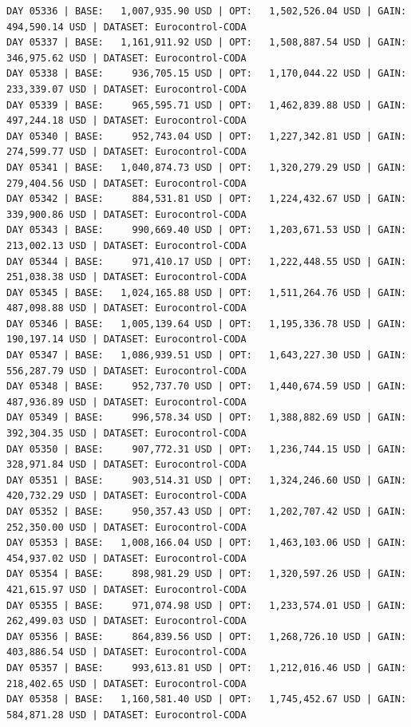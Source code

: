 \documentclass[11pt,a4paper]{article}
\begin{document}
\begin{verbatim}
DAY 05336 | BASE:   1,007,935.90 USD | OPT:   1,502,526.04 USD | GAIN: 494,590.14 USD | DATASET: Eurocontrol-CODA
DAY 05337 | BASE:   1,161,911.92 USD | OPT:   1,508,887.54 USD | GAIN: 346,975.62 USD | DATASET: Eurocontrol-CODA
DAY 05338 | BASE:     936,705.15 USD | OPT:   1,170,044.22 USD | GAIN: 233,339.07 USD | DATASET: Eurocontrol-CODA
DAY 05339 | BASE:     965,595.71 USD | OPT:   1,462,839.88 USD | GAIN: 497,244.18 USD | DATASET: Eurocontrol-CODA
DAY 05340 | BASE:     952,743.04 USD | OPT:   1,227,342.81 USD | GAIN: 274,599.77 USD | DATASET: Eurocontrol-CODA
DAY 05341 | BASE:   1,040,874.73 USD | OPT:   1,320,279.29 USD | GAIN: 279,404.56 USD | DATASET: Eurocontrol-CODA
DAY 05342 | BASE:     884,531.81 USD | OPT:   1,224,432.67 USD | GAIN: 339,900.86 USD | DATASET: Eurocontrol-CODA
DAY 05343 | BASE:     990,669.40 USD | OPT:   1,203,671.53 USD | GAIN: 213,002.13 USD | DATASET: Eurocontrol-CODA
DAY 05344 | BASE:     971,410.17 USD | OPT:   1,222,448.55 USD | GAIN: 251,038.38 USD | DATASET: Eurocontrol-CODA
DAY 05345 | BASE:   1,024,165.88 USD | OPT:   1,511,264.76 USD | GAIN: 487,098.88 USD | DATASET: Eurocontrol-CODA
DAY 05346 | BASE:   1,005,139.64 USD | OPT:   1,195,336.78 USD | GAIN: 190,197.14 USD | DATASET: Eurocontrol-CODA
DAY 05347 | BASE:   1,086,939.51 USD | OPT:   1,643,227.30 USD | GAIN: 556,287.79 USD | DATASET: Eurocontrol-CODA
DAY 05348 | BASE:     952,737.70 USD | OPT:   1,440,674.59 USD | GAIN: 487,936.89 USD | DATASET: Eurocontrol-CODA
DAY 05349 | BASE:     996,578.34 USD | OPT:   1,388,882.69 USD | GAIN: 392,304.35 USD | DATASET: Eurocontrol-CODA
DAY 05350 | BASE:     907,772.31 USD | OPT:   1,236,744.15 USD | GAIN: 328,971.84 USD | DATASET: Eurocontrol-CODA
DAY 05351 | BASE:     903,514.31 USD | OPT:   1,324,246.60 USD | GAIN: 420,732.29 USD | DATASET: Eurocontrol-CODA
DAY 05352 | BASE:     950,357.43 USD | OPT:   1,202,707.42 USD | GAIN: 252,350.00 USD | DATASET: Eurocontrol-CODA
DAY 05353 | BASE:   1,008,166.04 USD | OPT:   1,463,103.06 USD | GAIN: 454,937.02 USD | DATASET: Eurocontrol-CODA
DAY 05354 | BASE:     898,981.29 USD | OPT:   1,320,597.26 USD | GAIN: 421,615.97 USD | DATASET: Eurocontrol-CODA
DAY 05355 | BASE:     971,074.98 USD | OPT:   1,233,574.01 USD | GAIN: 262,499.03 USD | DATASET: Eurocontrol-CODA
DAY 05356 | BASE:     864,839.56 USD | OPT:   1,268,726.10 USD | GAIN: 403,886.54 USD | DATASET: Eurocontrol-CODA
DAY 05357 | BASE:     993,613.81 USD | OPT:   1,212,016.46 USD | GAIN: 218,402.65 USD | DATASET: Eurocontrol-CODA
DAY 05358 | BASE:   1,160,581.40 USD | OPT:   1,745,452.67 USD | GAIN: 584,871.28 USD | DATASET: Eurocontrol-CODA

\end{verbatim}
\end{document}
